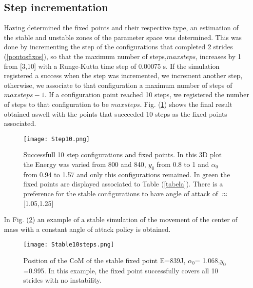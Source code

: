 \subsection{Step incrementation}
Having determined the fixed points and their respective type, an estimation of the stable and unstable zones of the parameter space was determined. This was done by incrementing the step of the configurations that completed 2 strides (\ref{pontosfixos}), so that the maximum number of steps,$maxsteps$, increases by 1 from [3,10] with a Runge-Kutta time step of 0.00075 s. If the simulation registered a success when the step was incremented, we increment another step, otherwise, we associate to that configuration a maximum number of steps of $maxsteps-1$. If a configuration point reached 10 steps, we registered the number of steps to that configuration to be $maxsteps$.
Fig. (\ref{step_10}) shows the final result obtained aswell with the points that succeeded 10 steps as the fixed points associated.
\begin{figure}[H]
  \centering
  \texttt{[image: Step10.png]}
  \caption{Successfull 10 step configurations and fixed points. In this 3D plot the Energy was varied from 800 and 840, $y_0$ from 0.8 to 1 and $\alpha_0$ from 0.94 to 1.57 and only this configurations remained. In green the fixed points are displayed associated to Table (\ref{tabela}). There is a preference for the stable configurations to have angle of attack of $\approx$ [1.05,1.25]}
  \label{step_10}
  \end{figure}

In Fig. (\ref{estavel}) an example of a stable simulation of the movement of the center of mass with a constant angle of attack policy is obtained.
\begin{figure}[H]
  \centering
  \texttt{[image: Stable10steps.png]}
  \caption{Position of the CoM of the stable fixed point E=839J, $\alpha_0$= 1.068,$y_0$=0.995. In this example, the fixed point successfully covers all 10 strides with no instability. }
  \label{estavel}
\end{figure}





